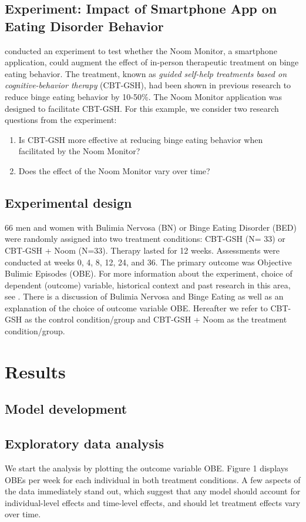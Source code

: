 \documentclass{article}
\begin{document}
\subsection*{Experiment: Impact of Smartphone App on Eating Disorder Behavior}
 conducted an experiment to test whether the Noom Monitor, a smartphone application, could augment the effect of in-person therapeutic treatment on binge eating behavior.  The treatment, known as \emph{guided self-help treatments based on cognitive-behavior therapy} (CBT-GSH), had been shown in previous research to reduce binge eating behavior by 10-50\%.  The Noom Monitor application was designed to facilitate CBT-GSH.  For this example, we consider two research questions from the experiment:
\begin{enumerate}
\item{Is CBT-GSH more effective at reducing binge eating behavior when facilitated by the Noom Monitor?}
\item{Does the effect of the Noom Monitor vary over time?}
\end{enumerate}

\subsection*{Experimental design}
66 men and women with Bulimia Nervosa (BN) or Binge Eating Disorder (BED) were randomly assigned into two treatment conditions: CBT-GSH (N= 33) or CBT-GSH + Noom (N=33).  Therapy lasted for 12 weeks.  Assessments were conducted at weeks 0, 4, 8, 12, 24, and 36.  The primary outcome was Objective Bulimic Episodes (OBE).  For more information about the experiment, choice of dependent (outcome) variable, historical context and past research in this area, see . There is a discussion of Bulimia Nervosa and Binge Eating as well as an explanation of the choice of outcome variable OBE. Hereafter we refer to CBT-GSH as the control condition/group and CBT-GSH + Noom as the treatment condition/group.

\section*{Results}
\subsection*{Model development}
\subsection*{Exploratory data analysis}
We start the analysis by plotting the outcome variable OBE. Figure 1 displays OBEs per week for each individual in both treatment conditions.  A few aspects of the data immediately stand out, which suggest that any model should account for individual-level effects and time-level effects, and should let treatment effects vary over time.  
\end{document}
